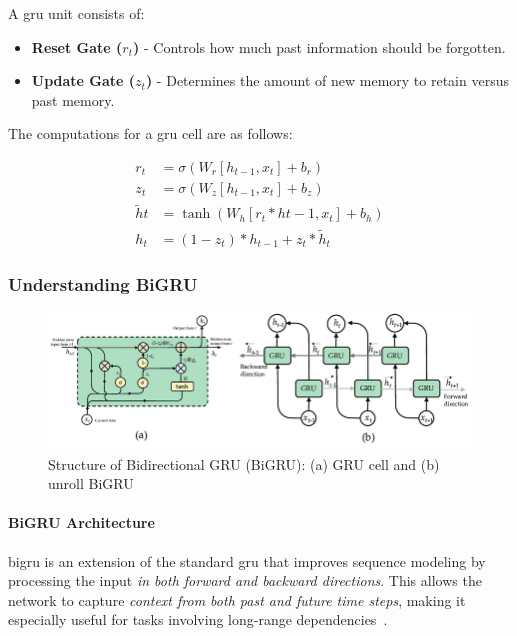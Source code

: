 A \acrshort{gru} unit consists of:
\begin{itemize}
\item \textbf{Reset Gate ($r_t$)} - Controls how much past information should be forgotten.
\item \textbf{Update Gate ($z_t$)} - Determines the amount of new memory to retain versus past memory.
\end{itemize}

The computations for a \acrshort{gru} cell are as follows:

\begin{align}
r_t &= \sigma(W_r [h_{t-1}, x_t] + b_r) \\
z_t &= \sigma(W_z [h_{t-1}, x_t] + b_z) \\
\tilde{h}t &= \tanh(W_h [r_t * h{t-1}, x_t] + b_h) \\
h_t &= (1 - z_t) * h_{t-1} + z_t * \tilde{h}_t
\end{align}

\subsubsection{Understanding BiGRU}

\begin{figure}[H]
    \centering
    \caption{Structure of Bidirectional GRU (BiGRU): (a) GRU cell and (b) unroll BiGRU}
    \label{fig:bigru}
    \includegraphics[width=\textwidth]{img/sections/back/bigru.png}
\end{figure}

\paragraph{BiGRU Architecture} \acrfull{bigru} is an extension of the standard \acrshort{gru} that improves sequence 
modeling by processing the input \emph{in both forward and backward directions}. This allows the network to capture 
\emph{context from both past and future time steps}, making it especially useful for tasks involving 
long-range dependencies~\parencite{shaban2024SMPDL}.

